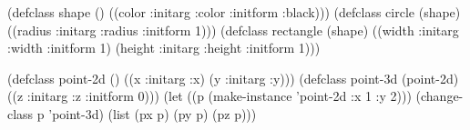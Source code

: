 \begin{examplebox}[title=Jerarquía de figuras geométricas]
\begin{lispcode}
(defclass shape () ((color :initarg :color :initform :black)))
(defclass circle (shape) ((radius :initarg :radius :initform 1)))
(defclass rectangle (shape) ((width :initarg :width :initform 1) (height :initarg :height :initform 1)))
\end{lispcode}
\end{examplebox}

\begin{examplebox}[title=Change-class para migración]
\begin{lispcode}
(defclass point-2d () ((x :initarg :x) (y :initarg :y)))
(defclass point-3d (point-2d) ((z :initarg :z :initform 0)))
(let ((p (make-instance 'point-2d :x 1 :y 2)))
  (change-class p 'point-3d)
  (list (px p) (py p) (pz p)))
\end{lispcode}
\end{examplebox}

